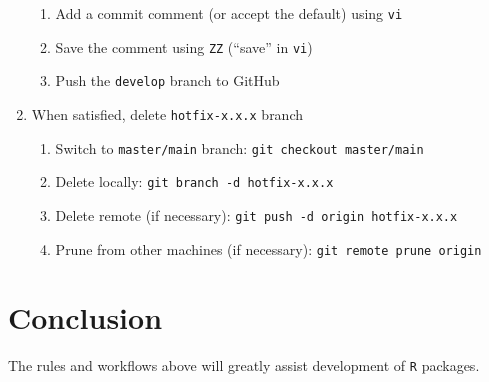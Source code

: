 \documentclass{article}
\begin{document}
\begin{enumerate}
\begin{enumerate}
	\item Add a commit comment (or accept the default) using \texttt{vi} 
	
	\item Save the comment using \texttt{ZZ} (``save'' in \texttt{vi})
	
	\item Push the \texttt{develop} branch to GitHub 

  \end{enumerate}
  \item When satisfied, delete \texttt{hotfix-x.x.x} branch
  \begin{enumerate}

    \item Switch to \texttt{master/main} branch: \texttt{git checkout master/main}

    \item Delete locally: \texttt{git branch -d hotfix-x.x.x}

    \item Delete remote (if necessary): \texttt{git push -d origin hotfix-x.x.x} 

	\item Prune from other machines (if necessary): \texttt{git remote prune origin} 

  \end{enumerate}
  

\end{enumerate}


\section{Conclusion} 
\label{sec:conclusion}

The rules and workflows above will greatly assist
development of \texttt{R} packages.








\end{document}
